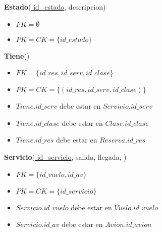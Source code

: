 \vspace*{0.1cm}
\noindent
\textbf{Estado}(\underline{
	id\_estado}, 
	descripcion)

\begin{itemize}[noitemsep]
	\item $FK = \emptyset$
	\item $PK = CK = \{id\_estado\}$
\end{itemize}


\vspace*{0.1cm}
\noindent
\textbf{Tiene}(\underline{})

\begin{itemize}[noitemsep]
	\item $FK = \{id\_res, id\_serv, id\_clase\}$
	\item $PK = CK = \{(id\_res, id\_serv, id\_clase)\}$
	\item $Tiene.id\_serv$ debe estar en $Servicio.id\_serv$
	\item $Tiene.id\_clase$ debe estar en $Clase.id\_clase$
	\item $Tiene.id\_res$ debe estar en $Reserva.id\_res$
\end{itemize}


\vspace*{0.1cm}
\noindent
\textbf{Servicio}(\underline{
	id\_servicio}, 
	salida, 
	llegada,
	)

\begin{itemize}[noitemsep]
	\item $FK = \{id\_vuelo, id\_av\}$
	\item $PK = CK = \{id\_servicio\}$
	\item $Servicio.id\_vuelo$ debe estar en $Vuelo.id\_vuelo$
	\item $Servicio.id\_av$ debe estar en $Avion.id\_avion$
\end{itemize}


